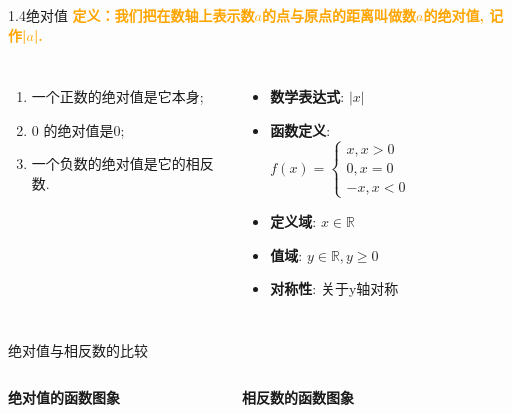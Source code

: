 \documentclass[aspectratio=169]{ctexbeamer} %
\date{\today}
\begin{document}
\begin{frame}{1.4绝对值}
\textbf{\textcolor{orange}{定义：我们把在数轴上表示数$a$的点与原点的距离叫做数$a$的绝对值, 记作|$a$|.}}
\begin{columns}
\begin{enumerate}[label={\arabic*.}]
\item 一个正数的绝对值是它本身; 
\item 0 的绝对值是0;
\item 一个负数的绝对值是它的相反数.
\end{enumerate}

\begin{itemize}
    \item \textbf{数学表达式}:  $\left|  x  \right|$
    \item  \textbf{函数定义}: \[ f(x) = \begin{cases}
    x, x>0 \\
    0, x=0 \\
    -x, x<0
    \end{cases}
    \]
    \item \textbf{定义域}: $x \in \mathbb{R}$
    \item \textbf{值域}: $y \in \mathbb{R}, y \geq 0$
    \item \textbf{对称性}: 关于y轴对称
\end{itemize}


\begin{figure}
\centering
\scalebox{1.8}{}
\end{figure}

\end{columns}
\end{frame}

\begin{frame}{绝对值与相反数的比较}
\begin{columns}
\textbf{绝对值的函数图象} \\
\begin{figure}
\centering
\scalebox{1.8}{}
\end{figure}

\textbf{相反数的函数图象} \\
\begin{figure}
\centering
\scalebox{1.8}{}
\end{figure}

\end{columns}
\end{frame}
\end{document}
